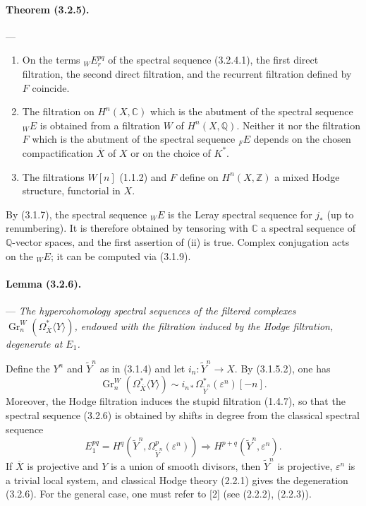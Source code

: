 \documentclass[10pt]{article}
\newcommand{\C}{\mathbb C}
\newcommand{\Q}{\mathbb Q}
\newcommand{\Z}{\mathbb Z}
\newcommand{\Gr}{\operatorname{Gr}}
\begin{document}
\paragraph{Theorem (3.2.5).} --- {\itshape
\begin{enumerate}[label=(\roman*),font=\itshape]
\item On the terms ${}_WE_r^{pq}$ of the spectral sequence (3.2.4.1), the first direct filtration, the second direct filtration, and the recurrent filtration defined by $F$ coincide.
\item The filtration on $H^n(X,\C)$ which is the abutment of the spectral sequence ${}_WE$ is obtained from a filtration $W$ of $H^n(X,\Q)$. Neither it nor the filtration $F$ which is the abutment of the spectral sequence ${}_FE$ depends on the chosen compactification $\overline X$ of $X$ or on the choice of $K^*$.
\item The filtrations $W[n]$ (1.1.2) and $F$ define on $H^n(X,\Z)$ a mixed Hodge structure, functorial in $X$.
\end{enumerate}}

By (3.1.7), the spectral sequence ${}_WE$ is the Leray spectral sequence for $j_*$ (up to renumbering). It is therefore obtained by tensoring with $\C$ a spectral sequence of $\Q$-vector spaces, and the first assertion of (ii) is true. Complex conjugation acts on the ${}_WE$; it can be computed via (3.1.9).

\paragraph{Lemma (3.2.6).} --- {\itshape The hypercohomology spectral sequences of the filtered complexes $\Gr_n^W(\Omega_{\overline X}^{*}\langle Y\rangle)$, endowed with the filtration induced by the Hodge filtration, degenerate at $E_1$.}

Define the $Y^n$ and $\widetilde Y^n$ as in (3.1.4) and let $i_n:\widetilde Y^n\to X$. By (3.1.5.2), one has
\[
\Gr_n^W(\Omega_{\overline X}^{*}\langle Y\rangle)
\sim i_{n*}\Omega_{\widetilde Y^n}^{*}(\varepsilon^n)[-n].
\]
Moreover, the Hodge filtration induces the stupid filtration (1.4.7), so that the spectral sequence (3.2.6) is obtained by shifts in degree from the classical spectral sequence
\[
E_1^{pq}=H^q(\widetilde Y^n,\Omega_{\widetilde Y^n}^p(\varepsilon^n))
\Rightarrow H^{p+q}(\widetilde Y^n,\varepsilon^n).
\]
If $\overline X$ is projective and $Y$ is a union of smooth divisors, then $\widetilde Y^n$ is projective, $\varepsilon^n$ is a trivial local system, and classical Hodge theory (2.2.1) gives the degeneration (3.2.6). For the general case, one must refer to [2] (see (2.2.2), (2.2.3)).
\end{document}
